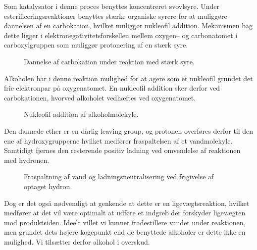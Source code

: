     Som katalysator i denne proces benyttes koncentreret svovlsyre. Under esterificeringsreaktioner benyttes stærke organiske syrere for at muliggøre dannelsen af en carbokation, hvilket muliggør nukleofil addition. Mekanismen bag dette ligger i elektronegativitetsforskellen mellem oxygen-- og carbonatomet i carboxylgruppen som muliggør protonering af en stærk syre.
    \begin{figure}[H]
        \caption{Dannelse af carbokation under reaktion med stærk syre.}
    \end{figure}
    Alkoholen har i denne reaktion mulighed for at agere som et nukleofil grundet det frie elektronpar på oxygenatomet. En nukleofil addition sker derfor ved carbokationen, hvorved alkoholet vedhæftes ved oxygenatomet.
    \begin{figure}[H]
        \caption{Nukleofil addition af alkoholmolekyle.}
    \end{figure}
    Den dannede ether er en dårlig leaving group, og protonen overføres derfor til den ene af hydroxygrupperne hvilket medfører fraspaltelsen af et vandmolekyle. Samtidigt fjernes den resterende positiv ladning ved omvendelse af reaktionen med hydronen.
    \begin{figure}[H]
        \caption{Fraspaltning af vand og ladningsneutralisering ved frigivelse af optaget hydron.}
    \end{figure}
    Dog er det også nødvendigt at genkende at dette er en ligevægtsreaktion, hvilket medfører at det vil være optimalt at udføre et indgreb der forskyder ligevægten mod produktsiden. Ideelt villet vi kunnet fradestillere vandet under reaktionen, men grundet dets højere kogepunkt end de benyttede alkoholer er dette ikke en mulighed. Vi tilsætter derfor alkohol i overskud.
    
